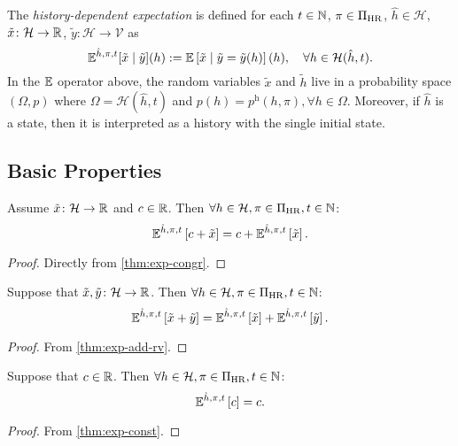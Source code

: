 \begin{definition}\label{def:expect-h-cnd-rv}
The \emph{history-dependent expectation} is defined for each $t\in \mathbb{N}$, $\pi\in \Pi_{\mathrm{HR}}$, $\hat{h}\in \mathcal{H}$, $\tilde{x}\colon \mathcal{H} \to \mathbb{R}$, $\tilde{y}\colon \mathcal{H} \to \mathcal{\mathcal{V}}$ as
\begin{equation*}
\mathbb{E}^{\hat{h}, \pi, t} [\tilde{x} \mid \tilde{y} ](h)
:= \mathbb{E} \left[ \tilde{x} \mid \tilde{y} = \tilde{y}(h) \right](h), \quad\forall h\in \mathcal{H}(\hat{h}, t).
\end{equation*}
In the $\mathbb{E}$ operator above, the random variables $\tilde{x}$ and $\tilde{h}$ live in a probability space $(\Omega, p)$ where $\Omega = \mathcal{H}(\hat{h}, t)$ and $p(h) = p^{\mathrm{h}}(h, \pi), \forall h\in \Omega$.
Moreover, if $\hat{h}$ is a state, then it is interpreted as a history with the single initial state.
\end{definition}


\subsection{Basic Properties}


\begin{theorem} \label{thm:exph-congr}
Assume $\tilde{x} \colon \mathcal{H} \to \mathbb{R}$ and $c \in \mathbb{R}$. Then $\forall h\in \mathcal{H}, \pi\in \Pi_{\mathrm{HR}}, t \in \mathbb{N}$:
\[
  \mathbb{E}^{\hat{h}, \pi, t} \left[ c + \tilde{x} \right]
  =
  c + \mathbb{E}^{\hat{h}, \pi, t} \left[ \tilde{x} \right].
\]
\end{theorem}
\begin{proof}
Directly from \cref{thm:exp-congr}. 
\end{proof}

\begin{theorem} \label{thm:exph-add-rv}
Suppose that $\tilde{x}, \tilde{y} \colon \mathcal{H} \to \mathbb{R} $. Then $\forall h\in \mathcal{H}, \pi\in \Pi_{\mathrm{HR}}, t \in \mathbb{N}$:
\[
  \mathbb{E}^{\hat{h}, \pi, t} \left[ \tilde{x} + \tilde{y} \right]
  =
  \mathbb{E}^{\hat{h}, \pi, t} \left[ \tilde{x} \right] + \mathbb{E}^{\hat{h}, \pi, t} \left[ \tilde{y} \right].
\]
\end{theorem}
\begin{proof}
  From \cref{thm:exp-add-rv}.
\end{proof}

\begin{theorem} \label{thm:exph-const}
Suppose that $c\in \mathbb{R}$. Then $\forall h\in \mathcal{H}, \pi\in \Pi_{\mathrm{HR}}, t \in \mathbb{N}$:
\[
  \mathbb{E}^{\hat{h}, \pi, t} \left[ c \right] = c.
\]
\end{theorem}
\begin{proof}
  From \cref{thm:exp-const}.
\end{proof}

